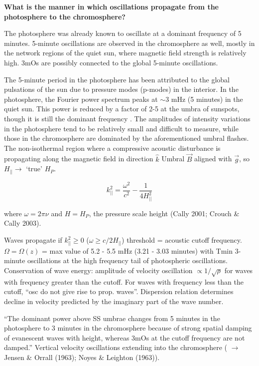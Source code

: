 
\textbf{What is the manner in which oscillations propagate from the photosphere to
the chromosphere?}

The photosphere was already known to oscillate at a dominant frequency of 5
minutes.
5-minute oscillations are observed in the chromosphere as well, mostly in
the network regions of the quiet sun, where magnetic field strength is
relatively high.
3mOs are possibly connected to the global 5-minute oscillations.

The 5-minute period in the photosphere has been
attributed to the global pulsations of the sun due to pressure modes
(p-modes) in the interior. In the photosphere, the Fourier power spectrum
peaks at $\sim$3 mHz (5 minutes) in the quiet sun.
This power is reduced by a
factor of 2-5 at the umbra of sunspots, though it is still the dominant
frequency \citep{Felipe2010; Bogdan2006 p. 323}.
The amplitudes of intensity variations in the photosphere tend to be relatively
small and difficult to measure, while those in the chromosphere are
dominated by the aforementioned umbral flashes.
The non-isothermal region where a compressive acoustic disturbance is
propagating along the magnetic field in
direction $\hat{k}$
Umbral $\vec{B}$ aligned with $\vec{g}$, so $H_{||} \rightarrow$
`true' $H_{P}$.

\begin{equation}
    k_{||}^{2} = \frac{\omega^{2}}{c^{2}} - \frac{1}{4H_{||}^{2}}
\end{equation}

where $\omega = 2\pi\nu$ and $H = H_{P}$,
the pressure scale height
(Cally 2001; Crouch \& Cally 2003).

Waves propagate if
$k_{||}^{2} \ge 0$
($ \omega \ge c/2H_{||} $)
threshold = acoustic cutoff frequency.
$\Omega = \Omega(z)$ = max value of 5.2 - 5.5 mHz (3.21 - 3.03 minutes) with
Tmin 
3-minute oscillations at the high frequency tail of photospheric
oscillations.
Conservation of wave energy: amplitude of velocity oscillation
$\propto 1/\sqrt{\rho}$ for
waves with frequency greater than the cutoff.
For
waves with frequency less than the cutoff,
``osc do not give rise to prop. waves''.
Dispersion relation determines
decline in velocity predicted by the imaginary part of the wave number.

``The dominant power above SS umbrae changes from 5 minutes in the photosphere to
3 minutes in the chromosphere because of strong spatial damping of evanescent
waves with height, whereas 3mOs at the cutoff frequency are not damped.''
Vertical velocity oscillations extending
into the chromosphere
(\cite{Judge2006} $\rightarrow$ Jensen \& Orrall (1963);
Noyes \& Leighton (1963)).


